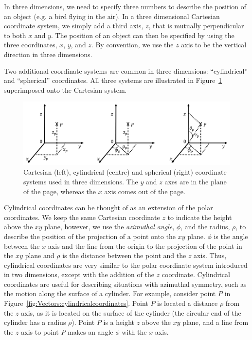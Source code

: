 In three dimensions, we need to specify three numbers to describe the position of an object (e.g. a bird flying in the air). In a three dimensional Cartesian coordinate system, we simply add a third axis, $z$, that is mutually perpendicular to both $x$ and $y$. The position of an object can then be specified by using the three coordinates, $x$, $y$, and $z$. By convention, we use the $z$ axis to be the vertical direction in three dimensions.

Two additional coordinate systems are common in three dimensions: ``cylindrical'' and ``spherical'' coordinates. All three systems are illustrated in Figure~\ref{fig:Vectors:3dcoords} superimposed onto the Cartesian system.

\begin{figure}[!htbp]
\centering
\includegraphics[width=1\linewidth]{files/3dcoords-a3f8711ee5b02abddd6686166e147e2c.png}
\caption[]{Cartesian (left), cylindrical (centre) and spherical (right) coordinate systems used in three dimensions. The $y$ and $z$ axes are in the plane of the page, whereas the $x$ axis comes out of the page.}
\label{fig:Vectors:3dcoords}
\end{figure}

Cylindrical coordinates can be thought of as an extension of the polar coordinates. We keep the same Cartesian coordinate $z$ to indicate the height above the $xy$ plane, however, we use the \textit{azimuthal angle}, $\phi$, and the radius, $\rho$, to describe the position of the projection of a point onto the $xy$ plane. $\phi$ is the angle between the $x$ axis and the line from the origin to the projection of the point in the $xy$ plane and $\rho$ is the distance between the point and the $z$ axis. Thus, cylindrical coordinates are very similar to the polar coordinate system introduced in two dimensions, except with the addition of the $z$ coordinate. Cylindrical coordinates are useful for describing situations with azimuthal symmetry, such as the motion along the surface of a cylinder. For example, consider point $P$ in Figure~\ref{fig:Vectors:cylindricalcoordinates}. Point $P$ is located a distance $\rho$ from the $z$ axis, as it is located on the surface of the cylinder (the circular end of the cylinder has a radius $\rho$). Point $P$ is a height $z$ above the $xy$ plane, and a line from the $z$ axis to point $P$ makes an angle $\phi$ with the $x$ axis.

